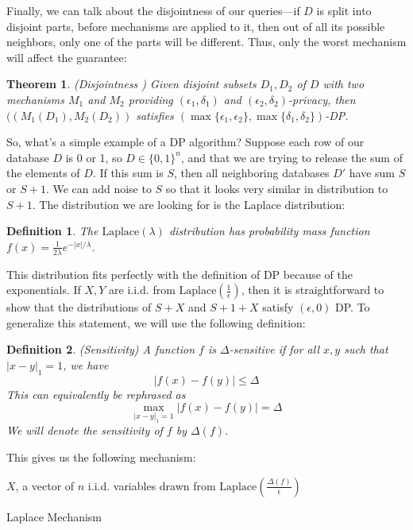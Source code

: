 \documentclass[11pt]{article}
\newtheorem{theorem}{Theorem}
\newtheorem{defn}{Definition}
\begin{document}
Finally, we can talk about the disjointness of our queries---if $D$ is split into disjoint parts, before mechanisms are applied to it, then out of all its possible neighbors, only one of the parts will be different. Thus, only the worst mechanism will affect the guarantee:
\begin{theorem}\label{thm:disj}
(Disjointness \cite{Dwork:2006}) Given disjoint subsets $D_1, D_2$ of $D$ with two mechanisms $M_1$ and $M_2$ providing $(\epsilon_1, \delta_1)$ and $(\epsilon_2, \delta_2)$-privacy, then $((M_1(D_1), M_2(D_2))$ satisfies $(\max\{\epsilon_1, \epsilon_2\}, \max\{\delta_1, \delta_2\})$-DP.
\end{theorem}

So, what's a simple example of a DP algorithm? Suppose each row of our database $D$ is 0 or 1, so $D \in \{0, 1\}^n$, and that we are trying to release the sum of the elements of $D$. If this sum is $S$, then all neighboring databases $D'$ have sum $S$ or $S+1$. We can add noise to $S$ so that it looks very similar in distribution to $S+1$. The distribution we are looking for is the Laplace distribution:
\begin{defn}
The $\text{Laplace}(\lambda)$ distribution has probability mass function $f(x) = \frac{1}{2\lambda}e^{-|x|/\lambda}$.
\end{defn}
This distribution fits perfectly with the definition of DP because of the exponentials. If $X,Y$ are i.i.d. from $\text{Laplace}\left(\frac{1}{\epsilon}\right)$, then it is straightforward to show that the distributions of $S+X$ and $S+1+X$ satisfy $(\epsilon, 0)$ DP. To generalize this statement, we will use the following definition:
\begin{defn}
(Sensitivity) A function $f$ is $\Delta$-sensitive if for all $x,y$ such that $|x-y|_1 = 1$, we have 
\[
|f(x) - f(y)| \leq \Delta
\]
This can equivalently be rephrased as 
\[
\max_{|x-y|_1=1}|f(x) - f(y)| = \Delta
\]
We will denote the sensitivity of $f$ by $\Delta(f)$.
\end{defn}
This gives us the following mechanism:

\begin{algorithm}\label{alg:1}
\SetAlgoLined
{}
$X$, a vector of $n$ i.i.d. variables drawn from $\text{Laplace}\left(\frac{\Delta(f)}{\epsilon}\right)$\;
\caption{Laplace Mechanism}
\end{algorithm}
\end{document}
